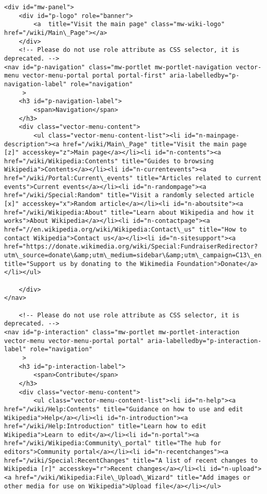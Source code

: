 \documentclass[11pt]{article}
\begin{document}
\begin{Verbatim}[commandchars=\\\{\}]
<div id="mw-panel">
	<div id="p-logo" role="banner">
		<a  title="Visit the main page" class="mw-wiki-logo" href="/wiki/Main\_Page"></a>
	</div>
	<!-- Please do not use role attribute as CSS selector, it is deprecated. -->
<nav id="p-navigation" class="mw-portlet mw-portlet-navigation vector-menu vector-menu-portal portal portal-first" aria-labelledby="p-navigation-label" role="navigation" 
	 >
	<h3 id="p-navigation-label">
		<span>Navigation</span>
	</h3>
	<div class="vector-menu-content">
		<ul class="vector-menu-content-list"><li id="n-mainpage-description"><a href="/wiki/Main\_Page" title="Visit the main page [z]" accesskey="z">Main page</a></li><li id="n-contents"><a href="/wiki/Wikipedia:Contents" title="Guides to browsing Wikipedia">Contents</a></li><li id="n-currentevents"><a href="/wiki/Portal:Current\_events" title="Articles related to current events">Current events</a></li><li id="n-randompage"><a href="/wiki/Special:Random" title="Visit a randomly selected article [x]" accesskey="x">Random article</a></li><li id="n-aboutsite"><a href="/wiki/Wikipedia:About" title="Learn about Wikipedia and how it works">About Wikipedia</a></li><li id="n-contactpage"><a href="//en.wikipedia.org/wiki/Wikipedia:Contact\_us" title="How to contact Wikipedia">Contact us</a></li><li id="n-sitesupport"><a href="https://donate.wikimedia.org/wiki/Special:FundraiserRedirector?utm\_source=donate\&amp;utm\_medium=sidebar\&amp;utm\_campaign=C13\_en.wikipedia.org\&amp;uselang=en" title="Support us by donating to the Wikimedia Foundation">Donate</a></li></ul>
		
	</div>
</nav>

	<!-- Please do not use role attribute as CSS selector, it is deprecated. -->
<nav id="p-interaction" class="mw-portlet mw-portlet-interaction vector-menu vector-menu-portal portal" aria-labelledby="p-interaction-label" role="navigation" 
	 >
	<h3 id="p-interaction-label">
		<span>Contribute</span>
	</h3>
	<div class="vector-menu-content">
		<ul class="vector-menu-content-list"><li id="n-help"><a href="/wiki/Help:Contents" title="Guidance on how to use and edit Wikipedia">Help</a></li><li id="n-introduction"><a href="/wiki/Help:Introduction" title="Learn how to edit Wikipedia">Learn to edit</a></li><li id="n-portal"><a href="/wiki/Wikipedia:Community\_portal" title="The hub for editors">Community portal</a></li><li id="n-recentchanges"><a href="/wiki/Special:RecentChanges" title="A list of recent changes to Wikipedia [r]" accesskey="r">Recent changes</a></li><li id="n-upload"><a href="/wiki/Wikipedia:File\_Upload\_Wizard" title="Add images or other media for use on Wikipedia">Upload file</a></li></ul>
		

\end{Verbatim}
\end{document}
